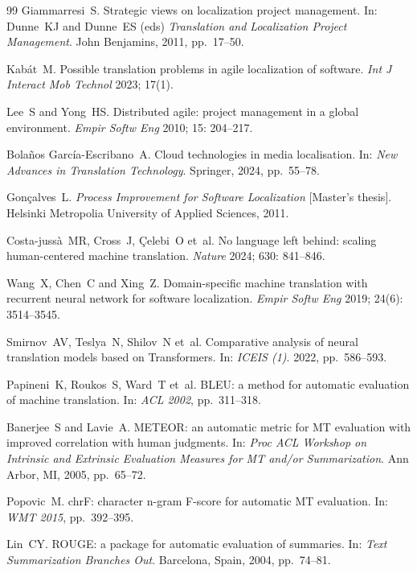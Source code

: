 \documentclass[pdflatex,sn-mathphys-num]{sn-jnl}
\begin{document}
\begin{thebibliography}{99}
Giammarresi~S.
\newblock Strategic views on localization project management.
\newblock In: Dunne~KJ and Dunne~ES (eds) \emph{Translation and Localization Project Management}. John Benjamins, 2011, pp.~17--50.

Kab\'{a}t~M.
\newblock Possible translation problems in agile localization of software.
\newblock \emph{Int J Interact Mob Technol} 2023; 17(1).

Lee~S and Yong~HS.
\newblock Distributed agile: project management in a global environment.
\newblock \emph{Empir Softw Eng} 2010; 15: 204--217.

Bola\~{n}os Garc\'{i}a-Escribano~A.
\newblock Cloud technologies in media localisation.
\newblock In: \emph{New Advances in Translation Technology}. Springer, 2024, pp.~55--78.

Gon\c{c}alves~L.
\newblock \emph{Process Improvement for Software Localization} [Master's thesis].
\newblock Helsinki Metropolia University of Applied Sciences, 2011.

Costa-juss\`{a}~MR, Cross~J, \c{C}elebi~O et~al.
\newblock No language left behind: scaling human-centered machine translation.
\newblock \emph{Nature} 2024; 630: 841--846.

Wang~X, Chen~C and Xing~Z.
\newblock Domain-specific machine translation with recurrent neural network for software localization.
\newblock \emph{Empir Softw Eng} 2019; 24(6): 3514--3545.

Smirnov~AV, Teslya~N, Shilov~N et~al.
\newblock Comparative analysis of neural translation models based on Transformers.
\newblock In: \emph{ICEIS (1)}. 2022, pp.~586--593.

Papineni~K, Roukos~S, Ward~T et~al.
\newblock BLEU: a method for automatic evaluation of machine translation.
\newblock In: \emph{ACL 2002}, pp.~311--318.

Banerjee~S and Lavie~A.
\newblock METEOR: an automatic metric for MT evaluation with improved correlation with human judgments.
\newblock In: \emph{Proc ACL Workshop on Intrinsic and Extrinsic Evaluation Measures for MT and/or Summarization}. Ann Arbor, MI, 2005, pp.~65--72.

Popovic~M.
\newblock chrF: character n-gram F-score for automatic MT evaluation.
\newblock In: \emph{WMT 2015}, pp.~392--395.

Lin~CY.
\newblock ROUGE: a package for automatic evaluation of summaries.
\newblock In: \emph{Text Summarization Branches Out}. Barcelona, Spain, 2004, pp.~74--81.


\end{thebibliography}
\end{document}
